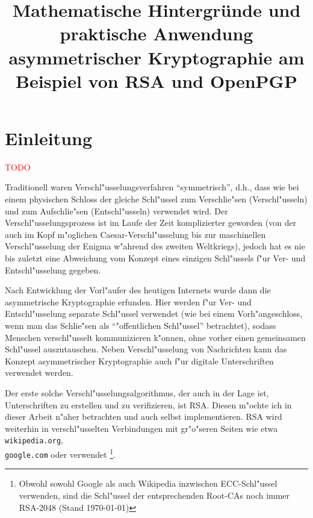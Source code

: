 \documentclass[12pt]{article}
\title{Mathematische Hintergr\"unde und praktische Anwendung asymmetrischer Kryptographie am Beispiel von RSA und OpenPGP}
\newcommand{\todo}[1]{\textcolor{red}{\mbox{TODO}}\marginpar{\textcolor{red}{#1}}}
\begin{document}
\maketitle
\thispagestyle{empty}
\newpage
\tableofcontents
\newpage

\section{Einleitung}

\todo{Brauche ich f"ur diese Sachen Zitate?}

Traditionell waren Verschl"usselungsverfahren "`symmetrisch"', d.h., dass wie bei einem physischen Schloss
der gleiche Schl"ussel zum Verschlie"sen (Verschl"usseln) und zum Aufschlie"sen (Entschl"usseln) verwendet wird.
Der Ver\-schl"us\-sel\-ungs\-pro\-zess ist im Laufe der Zeit komplizierter geworden
(von der auch im Kopf m"oglichen Caesar-Verschl"usselung bis zur
maschinellen Verschl"usselung der Enigma w"ah\-rend des zweiten Weltkriegs),
jedoch hat es nie bis zuletzt
eine Abweichung vom Konzept eines einzigen Schl"ussels f"ur Ver- und Entschl"usselung gegeben.

Nach Entwicklung der Vorl"aufer des heutigen Internets wurde dann die asymmetrische Kryptographie erfunden.
Hier werden f"ur Ver- und Entschl"usselung separate Schl"ussel verwendet
(wie bei einem Vorh"angeschloss, wenn man das Schlie"sen als "`"offentlichen Schl"ussel"' betrachtet),
sodass Menschen verschl"usselt kom\-mu\-ni\-zie\-ren k"onnen, ohne vorher einen gemeinsamen Schl"ussel auszutauschen.
Neben Verschl"usselung von Nachrichten kann das Konzept asymmetrischer Kryptographie
auch f"ur digitale Unterschriften verwendet werden.

Der erste solche Verschl"usselungsalgorithmus, der auch in der Lage ist, Unterschriften zu erstellen und zu verifizieren, ist RSA.
Diesen m"ochte ich in dieser Arbeit n"aher betrachten und auch selbst implementieren.
RSA wird weiterhin in verschl"usselten Verbindungen mit gr"o"seren Seiten
wie etwa \texttt{wikipedia.org}, \\ \texttt{google.com} oder \piibigsite{} verwendet%
\footnote{Obwohl sowohl Google als auch Wikipedia inzwischen ECC-Schl"ussel verwenden,
sind die Schl"ussel der entsprechenden Root-CAs noch immer RSA-2048 (Stand \today)}.
\end{document}
